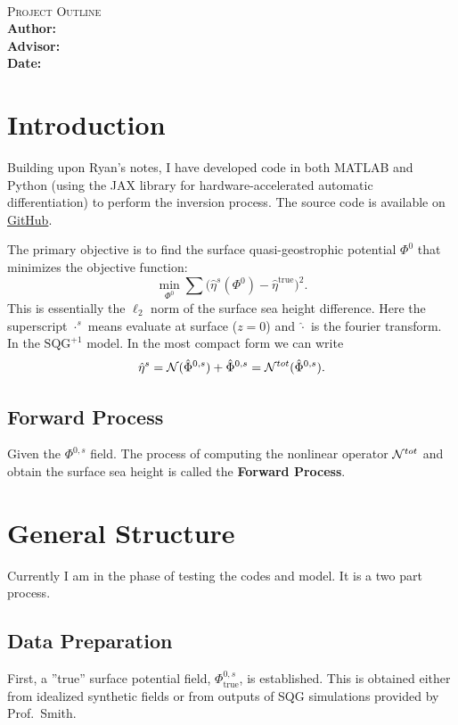 \documentclass[11pt]{article}
\makeatletter
\newcommand{\<}{\langle}
\renewcommand{\>}{\rangle}
\renewcommand{\makeproposaltitle}{%
\begin{center}
    \vspace*{0.5cm}
    {\Large\bfseries\color{ProposalNavy}\@proposaltitle \\[4pt]} {\normalsize\color{ProposalSteel}\textsc{Project Outline}}
    \\[8pt]
    \textbf{Author:} \@proposalauthor \\
    \textbf{Advisor:} \@proposaladvisor \\
    \textbf{Date:} \@proposaldate
\end{center}
\vspace{0.2cm}
}
\makeatother
\begin{document}
    \makeproposaltitle

    \section{Introduction}
    Building upon Ryan's notes, I have developed code in both MATLAB and Python (using the JAX library for hardware-accelerated automatic differentiation) to perform the inversion process. The source code is available on \href{https://github.com/ThomasLi0314/SQGp1-SWOT-Reconstruction}{GitHub}.

    The primary objective is to find the surface quasi-geostrophic potential $\Phi^{0}$ that minimizes the objective function:
    \begin{equation}
        \min_{\Phi^{0}}\sum \Big( \hat{\eta}^{s}(\Phi^{0}) - \hat{\eta}^{\text{true}}\Big)^{2}.
    \end{equation}
    This is essentially the $\ell_{2}$ norm of the surface sea height difference.
    Here the superscript $\cdot^{s}$ means evaluate at surface ($z = 0$) and
    $\hat{\cdot}$ is the fourier transform. In the $\text{SQG}^{+1}$ model. In
    the most compact form we can write
    \begin{equation}
        \hat{\eta}^{s} = \mathcal{N}(\hat{\Phi}^{0,s}) + \hat{\Phi}^{0,s} = \mathcal{N}^{tot}(\hat{\Phi}^{0,s}). \label{eq:objective}
    \end{equation}

    \subsection{Forward Process}
    Given the $\Phi^{0,s}$ field. The process of computing the nonlinear
    operator $\mathcal{N}^{tot}$ and obtain the surface sea height is called the
    \textbf{Forward Process}.

    \section{General Structure}
    Currently I am in the phase of testing the codes and model. It is a two part
    process.
    \subsection{Data Preparation}
    First, a ''true'' surface potential field, $\Phi^{0,s}_{\text{true}}$, is established. This is obtained either from idealized synthetic fields or from outputs of SQG simulations provided by Prof.\ Smith.
\end{document}
